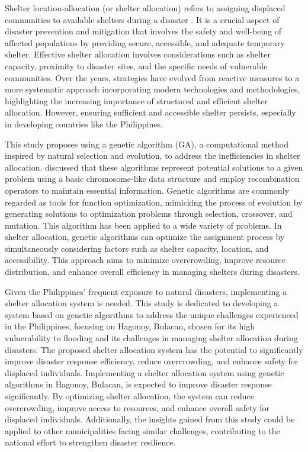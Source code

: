 Shelter location-allocation (or shelter allocation) refers to assigning displaced communities to available shelters during a disaster \parencite{Yin2023}. It is a crucial aspect of disaster prevention and mitigation that involves the safety and well-being of affected populations by providing secure, accessible, and adequate temporary shelter. Effective shelter allocation involves considerations such as shelter capacity, proximity to disaster sites, and the specific needs of vulnerable communities. Over the years, strategies have evolved from reactive measures to a more systematic approach incorporating modern technologies and methodologies, highlighting the increasing importance of structured and efficient shelter allocation. However, ensuring sufficient and accessible shelter persists, especially in developing countries like the Philippines.

This study proposes using a genetic algorithm (GA), a computational method inspired by natural selection and evolution, to address the inefficiencies in shelter allocation. \textcite{Mathew2012} discussed that these algorithms represent potential solutions to a given problem using a basic chromosome-like data structure and employ recombination operators to maintain essential information. Genetic algorithms are commonly regarded as tools for function optimization, mimicking the process of evolution by generating solutions to optimization problems through selection, crossover, and mutation. This algorithm has been applied to a wide variety of problems. In shelter allocation, genetic algorithms can optimize the assignment process by simultaneously considering factors such as shelter capacity, location, and accessibility. This approach aims to minimize overcrowding, improve resource distribution, and enhance overall efficiency in managing shelters during disasters.

Given the Philippines' frequent exposure to natural disasters, implementing a shelter allocation system is needed. This study is dedicated to developing a system based on genetic algorithms to address the unique challenges experienced in the Philippines, focusing on Hagonoy, Bulacan, chosen for its high vulnerability to flooding and its challenges in managing shelter allocation during disasters. The proposed shelter allocation system has the potential to significantly improve disaster response efficiency, reduce overcrowding, and enhance safety for displaced individuals. Implementing a shelter allocation system using genetic algorithms in Hagonoy, Bulacan, is expected to improve disaster response significantly. By optimizing shelter allocation, the system can reduce overcrowding, improve access to resources, and enhance overall safety for displaced individuals. Additionally, the insights gained from this study could be applied to other municipalities facing similar challenges, contributing to the national effort to strengthen disaster resilience.


